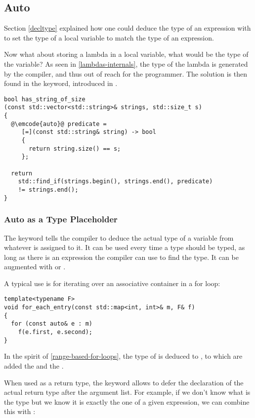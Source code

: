 \subsection{Auto}
\label{auto}

Section \ref{decltype} explained how one could deduce the type of an
expression with  to set the type of a local variable
to match the type of an expression.

Now what about storing a lambda in a local variable, what would be the
type of the variable? As seen in \ref{lambdas-internals}, the type of
the lambda is generated by the compiler, and thus out of reach for the
programmer. The solution is then found in the  keyword,
introduced in .

\begin{lstlisting}
bool has_string_of_size
(const std::vector<std::string>& strings, std::size_t s)
{
  @\emcode{auto}@ predicate =
     [=](const std::string& string) -> bool
     {
       return string.size() == s;
     };

  return
    std::find_if(strings.begin(), strings.end(), predicate)
    != strings.end();
}
\end{lstlisting}

\subsubsection{Auto as a Type Placeholder}

The  keyword tells the compiler to deduce the actual type
of a variable from whatever is assigned to it. It can be used every
time a type should be typed, as long as there is an expression the
compiler can use to find the type. It can be augmented with
 or \code{\&}.

A typical use is for iterating over an associative container in a for
loop:

\begin{lstlisting}
template<typename F>
void for_each_entry(const std::map<int, int>& m, F& f)
{
  for (const auto& e : m)
    f(e.first, e.second);
}
\end{lstlisting}

In the spirit of \ref{range-based-for-loops}, the type of  is
deduced to , to which are added the 
and the \code{\&}.

When used as a return type, the  keyword allows to defer
the declaration of the actual return type after the argument list. For
example, if we don't know what is the type but we know it is exactly
the one of a given expression, we can combine this with
:

